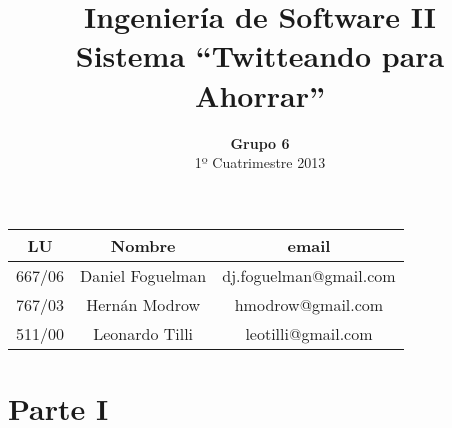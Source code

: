 \documentclass[a4paper,8pt]{article}
\title{Ingeniería de Software II\\ \textbf{Sistema ``Twitteando para Ahorrar''}}
\author{\textbf{Grupo 6}\\ 1º Cuatrimestre 2013}
\date{}
\begin{document}
\maketitle
\vspace{10cm}
\begin{center}

\begin{tabular}{|c|c|c|}
\hline
\hline
\textbf{LU}&\textbf{Nombre}&\textbf{email}\\
\hline
667/06&Daniel Foguelman &dj.foguelman@gmail.com\\
\hline
767/03&Hernán Modrow&hmodrow@gmail.com\\
\hline
511/00&Leonardo Tilli&leotilli@gmail.com\\
\hline
\hline
\end{tabular}
\end{center}
\newpage

\section{Parte I}



\end{document}
